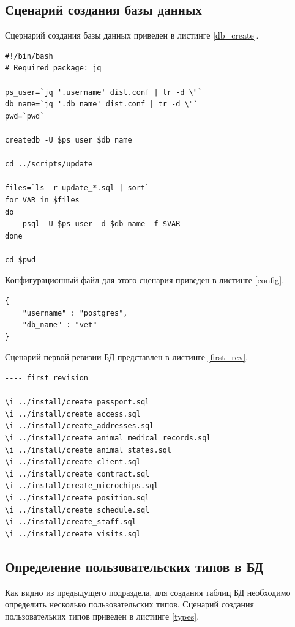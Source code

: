 \documentclass[a4paper,14pt]{article}
\begin{document}
\subsection{Сценарий создания базы данных}

Сцернарий создания базы данных приведен в листинге \ref{db_create}.

\begin{lstlisting}[label=db_create,caption=\text{Сценарий создания БД.}]
#!/bin/bash
# Required package: jq
	
ps_user=`jq '.username' dist.conf | tr -d \"`
db_name=`jq '.db_name' dist.conf | tr -d \"`
pwd=`pwd`
	
createdb -U $ps_user $db_name

cd ../scripts/update
	
files=`ls -r update_*.sql | sort`
for VAR in $files
do
	psql -U $ps_user -d $db_name -f $VAR 
done
	
cd $pwd
\end{lstlisting}

Конфигурационный файл для этого сценария приведен в листинге \ref{config}.

\begin{lstlisting}[label=config,caption=\text{Конфигурационный файл.}]
{
	"username" : "postgres",
	"db_name" : "vet"
}
\end{lstlisting}

Сценарий первой ревизии БД представлен в листинге \ref{first_rev}.

\begin{lstlisting}[label=first_rev,caption=\text{Первая ревизия.}]
---- first revision

\i ../install/create_passport.sql
\i ../install/create_access.sql
\i ../install/create_addresses.sql
\i ../install/create_animal_medical_records.sql
\i ../install/create_animal_states.sql
\i ../install/create_client.sql
\i ../install/create_contract.sql
\i ../install/create_microchips.sql
\i ../install/create_position.sql
\i ../install/create_schedule.sql
\i ../install/create_staff.sql
\i ../install/create_visits.sql
\end{lstlisting}

\subsection{Определение пользовательских типов в БД}

Как видно из предыдущего подраздела, для создания таблиц БД необходимо определить несколько пользовательских типов. Сценарий создания пользовательких типов приведен в листинге \ref{types}.
\end{document}
